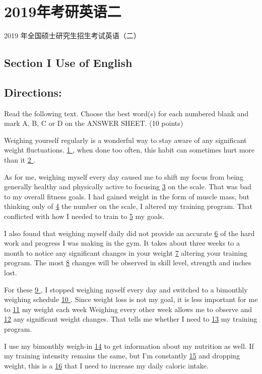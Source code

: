 \documentclass[UTF8,11pt]{ctexart}
\begin{document}
\section*{2019年考研英语二}
2019 年全国硕士研究生招生考试英语（二）


\subsection*{\textbf{Section I Use of English}}


\subsection*{\textbf{Directions:}}


Read the following text. Choose the best word(s) for each numbered blank and mark A, B, C or D on the ANSWER SHEET. (10 points)


Weighing yourself regularly is a wonderful way to stay aware of any significant weight fluctuations. \uline{1 }, when done too often, this habit can sometimes hurt more than it \uline{2 }.


As for me, weighing myself every day caused me to shift my focus from being generally healthy and physically active to focusing \uline{3} on the scale. That was bad to my overall fitness goals. I had gained weight in the form of muscle mass, but thinking only of \uline{4} the number on the scale, I altered my training program. That conflicted with how I needed to train to \uline{5} my goals.


I also found that weighing myself daily did not provide an accurate \uline{6} of the hard work and progress I was making in the gym. It takes about three weeks to a month to notice any significant changes in your weight \uline{7} altering your training program. The most \uline{8} changes will be observed in skill level, strength and inches lost.


For these \uline{9 }, I stopped weighing myself every day and switched to a bimonthly weighing schedule \uline{10 }. Since weight loss is not my goal, it is less important for me to \uline{11} my weight each week Weighing every other week allows me to observe and \uline{12} any significant weight changes. That tells me whether I need to \uline{13} my training program.


I use my bimonthly weigh-in \uline{14} to get information about my nutrition as well. If my training intensity remains the same, but I'm constantly \uline{15} and dropping weight, this is a \uline{16} that I need to increase my daily caloric intake.
\end{document}
